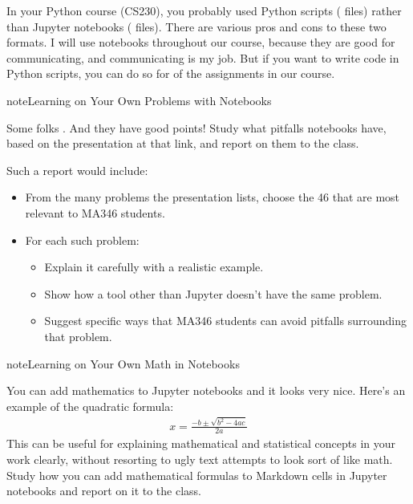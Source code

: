 \documentclass[letterpaper,10pt,english]{jupyterBook}
\begin{document}
\sphinxAtStartPar
In your Python course (CS230), you probably used Python scripts ( files) rather than Jupyter notebooks ( files).  There are various pros and cons to these two formats.  I will use notebooks throughout our course, because they are good for communicating, and communicating is my job.  But if you want to write code in Python scripts, you can do so for  of the assignments in our course.

\begin{sphinxadmonition}{note}{Learning on Your Own \sphinxhyphen{} Problems with Notebooks}

\sphinxAtStartPar
Some folks .  And they have good points!  Study what pitfalls notebooks have, based on the presentation at that link, and report on them to the class.
\end{sphinxadmonition}

\sphinxAtStartPar
Such a report would include:
\begin{itemize}
\item {} 
\sphinxAtStartPar
From the many problems the presentation lists, choose the 4\sphinxhyphen{}6 that are most relevant to MA346 students.

\item {} 
\sphinxAtStartPar
For each such problem:
\begin{itemize}
\item {} 
\sphinxAtStartPar
Explain it carefully with a realistic example.

\item {} 
\sphinxAtStartPar
Show how a tool other than Jupyter doesn’t have the same problem.

\item {} 
\sphinxAtStartPar
Suggest specific ways that MA346 students can avoid pitfalls surrounding that problem.

\end{itemize}

\end{itemize}

\begin{sphinxadmonition}{note}{Learning on Your Own \sphinxhyphen{} Math in Notebooks}

\sphinxAtStartPar
You can add mathematics to Jupyter notebooks and it looks very nice.  Here’s an example of the quadratic formula:
\begin{equation*}
\begin{split}x=\frac{-b\pm\sqrt{b^2-4ac}}{2a}\end{split}
\end{equation*}
\sphinxAtStartPar
This can be useful for explaining mathematical and statistical concepts in your work clearly, without resorting to ugly text attempts to look sort of like math.  Study how you can add mathematical formulas to Markdown cells in Jupyter notebooks and report on it to the class.
\end{sphinxadmonition}
\end{document}
